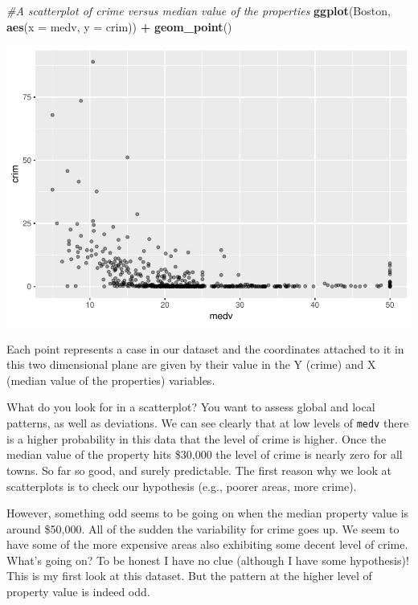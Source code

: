 \documentclass[]{book}
\newenvironment{Shaded}{\begin{snugshade}}{\end{snugshade}}
\newcommand{\CommentTok}[1]{\textcolor[rgb]{0.56,0.35,0.01}{\textit{#1}}}
\newcommand{\DataTypeTok}[1]{\textcolor[rgb]{0.13,0.29,0.53}{#1}}
\newcommand{\KeywordTok}[1]{\textcolor[rgb]{0.13,0.29,0.53}{\textbf{#1}}}
\newcommand{\NormalTok}[1]{#1}
\newcommand{\OperatorTok}[1]{\textcolor[rgb]{0.81,0.36,0.00}{\textbf{#1}}}
\newcommand{\StringTok}[1]{\textcolor[rgb]{0.31,0.60,0.02}{#1}}
\theoremstyle{definition}
\theoremstyle{definition}
\theoremstyle{definition}
\theoremstyle{remark}
\begin{document}
\begin{Shaded}
\begin{Highlighting}[]
\CommentTok{#A scatterplot of crime versus median value of the properties}
\KeywordTok{ggplot}\NormalTok{(Boston, }\KeywordTok{aes}\NormalTok{(}\DataTypeTok{x =}\NormalTok{ medv, }\DataTypeTok{y =}\NormalTok{ crim)) }\OperatorTok{+}
\StringTok{  }\KeywordTok{geom_point}\NormalTok{()}
\end{Highlighting}
\end{Shaded}

\includegraphics{03-visualisation_files/figure-latex/unnamed-chunk-35-1.pdf}

Each point represents a case in our dataset and the coordinates attached
to it in this two dimensional plane are given by their value in the Y
(crime) and X (median value of the properties) variables.

What do you look for in a scatterplot? You want to assess global and
local patterns, as well as deviations. We can see clearly that at low
levels of \texttt{medv} there is a higher probability in this data that
the level of crime is higher. Once the median value of the property hits
\$30,000 the level of crime is nearly zero for all towns. So far so
good, and surely predictable. The first reason why we look at
scatterplots is to check our hypothesis (e.g., poorer areas, more
crime).

However, something odd seems to be going on when the median property
value is around \$50,000. All of the sudden the variability for crime
goes up. We seem to have some of the more expensive areas also
exhibiting some decent level of crime. What's going on? To be honest I
have no clue (although I have some hypothesis)! This is my first look at
this dataset. But the pattern at the higher level of property value is
indeed odd.
\end{document}
